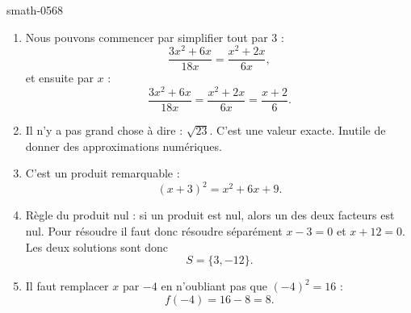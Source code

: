 
\begin{corrige}{smath-0568}

    \begin{enumerate}
        \item
            Nous pouvons commencer par simplifier tout par $3$ :
            \begin{equation}
                \frac{ 3x^2+6x }{ 18x }=\frac{ x^2+2x }{ 6x },
            \end{equation}
            et ensuite par \( x\) :
            \begin{equation}
                \frac{ 3x^2+6x }{ 18x }=\frac{ x^2+2x }{ 6x }=\frac{ x+2 }{ 6 }.
            \end{equation}
        \item
            Il n'y a pas grand chose à dire : \( \sqrt{23}\). C'est une valeur exacte. Inutile de donner des approximations numériques.
        \item
            C'est un produit remarquable :
            \begin{equation}
                (x+3)^2=x^2+6x+9.
            \end{equation}
        \item
            Règle du produit nul : si un produit est nul, alors un des deux facteurs est nul. Pour résoudre il faut donc résoudre séparément \( x-3=0\) et \( x+12=0\). Les deux solutions sont donc
            \begin{equation}
                S=\{ 3,-12 \}.
            \end{equation}
        \item
            Il faut remplacer \( x\) par \( -4\) en n'oubliant pas que \( (-4)^2=16\) :
            \begin{equation}
                f(-4)=16-8=8.
            \end{equation}
            

    \end{enumerate}
    

\end{corrige}

